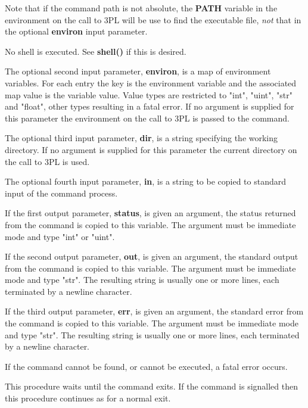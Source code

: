	Note that if the command path is not absolute, the {\bf PATH} variable
	in the environment on the call to 3PL will be use to find the
	executable file, {\em not} that in the optional {\bf environ} input
	parameter.

        No shell is executed. See {\bf shell()}  if this
	is desired.
        
        The optional second input parameter, {\bf environ}, is a map of environment
        variables. For each entry the key is the environment variable and the
        associated map value is the variable value. Value types are restricted
        to "int", "uint", "str" and "float", other types resulting in a fatal error.
        If no argument is supplied for this parameter the environment on the
        call to 3PL is passed to the command.
        
        The optional third input parameter, {\bf dir}, is a string specifying the working
        directory. If no argument is supplied for this parameter the current
        directory on the call to 3PL is used.
        
        The optional fourth input parameter, {\bf in}, is a string to be copied to
        standard input of the command process.
        
        If the first output parameter, {\bf status}, is given an argument, the
        status returned from the command is copied to this variable. The argument
        must be immediate mode and type "int" or "uint".
        
        If the second output parameter, {\bf out}, is given an argument, the
        standard output from the command is copied to this variable. The argument
        must be immediate mode and type "str". The resulting string is usually
        one or more lines, each terminated by a newline character.
        
        If the third output parameter, {\bf err}, is given an argument, the
        standard error from the command is copied to this variable. The argument
        must be immediate mode and type "str". The resulting string is usually
        one or more lines, each terminated by a newline character.
        
        If the command cannot be found, or cannot be executed, a fatal error occurs.
        
        This procedure waits until the command exits. If the command is signalled
        then this procedure continues as for a normal exit.


